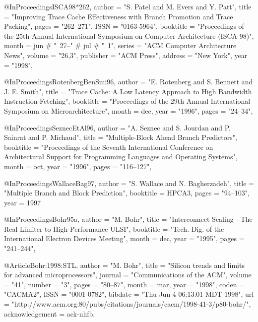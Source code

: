 @InProceedings{ISCA98*262,
  author =       "S. Patel and M. Evers and Y. Patt",
  title =        "Improving Trace Cache Effectiveness with Branch
                 Promotion and Trace Packing",
  pages =        "262--271",
  ISSN =         "0163-5964",
  booktitle =    "Proceedings of the 25th Annual International Symposium
                 on Computer Architecture ({ISCA}-98)",
  month =        jun # "~27--" # jul # "~1",
  series =       "ACM Computer Architecture News",
  volume =       "26,3",
  publisher =    "ACM Press",
  address =      "New York",
  year =         "1998",
}

@InProceedings{RotenbergBenSmi96,
  author =       "E. Rotenberg and S. Bennett and J. E. Smith",
  title =        "Trace Cache: {A} Low Latency Approach to High
                 Bandwidth Instruction Fetching",
  booktitle =    "Proceedings of the 29th Annual International Symposium
                 on Microarchitecture",
  month =        dec,
  year =         "1996",
  pages =        "24--34",
}

@InProceedings{SeznecEtAl96,
  author =       "A. Seznec and S. Jourdan and P.
                 Sainrat and P. Michaud",
  title =        "Multiple-Block Ahead Branch Predictors",
  booktitle =    "Proceedings of the Seventh International Conference on
                 Architectural Support for Programming Languages and
                 Operating Systems",
  month =        oct,
  year =         "1996",
  pages =        "116--127",
}

@InProceedings{WallaceBag97,
  author =       "S. Wallace and N. Bagherzadeh",
  title =        "Multiple Branch and Block Prediction",
  booktitle =     HPCA3,
  pages =        "94--103",
  year =	1997
}

@InProceedings{Bohr95a,
  author =       "M. Bohr",
  title =        "Interconnect Scaling - The Real Limiter to High-Performance
		 ULSI",
  booktitle =    "Tech. Dig. of the International Electron Devices Meeting",
  month =        dec,
  year =         "1995",
  pages =        "241--244",
}

@Article{Bohr:1998:STL,
  author =       "M. Bohr",
  title =        "Silicon trends and limits for advanced
                 microprocessors",
  journal =      "Communications of the ACM",
  volume =       "41",
  number =       "3",
  pages =        "80--87",
  month =        mar,
  year =         "1998",
  coden =        "CACMA2",
  ISSN =         "0001-0782",
  bibdate =      "Thu Jun 4 06:13:01 MDT 1998",
  url =          "http://www.acm.org:80/pubs/citations/journals/cacm/1998-41-3/p80-bohr/",
  acknowledgement = ack-nhfb,
}


